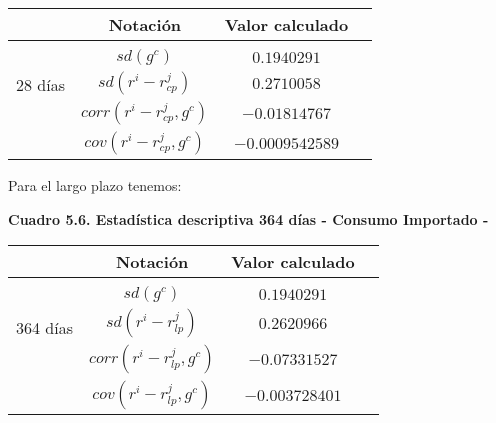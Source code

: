 \documentclass[
]{article}
\begin{document}
\begin{table}[h!]
                \begin{center} 
                    \begin{tabular}{|c|c|c|c|} 
                        \hline 
                        \mbox{}\;\;\;\;\;\mbox{}& \; Notación\;  & \; Valor calculado\; \\ 
                        \hline 
                        \multirow{4}{*}{\begin{sideways}28 días\end{sideways}}
                        &  &   \\
                        & $sd(g^c)$  & $0.1940291$  \\ 
                        &$sd(r^i-r_{cp}^j)$ & $0.2710058$ \\ 
                        &$corr(r^i-r_{cp}^j, g^c)$ & $-0.01814767$ \\ 
                        &$cov(r^i-r_{cp}^j, g^c)$  & $-0.0009542589$ \\                         
                        \hline \hline
                        \hline
                    \end{tabular}
                \end{center}
\end{table}

Para el largo plazo tenemos:

\begin{center}
\textbf{Cuadro 5.6. Estadística descriptiva 364 días - Consumo Importado -}
\end{center}

\begin{table}[h!]
                \begin{center} 
                    \begin{tabular}{|c|c|c|c|} 
                        \hline 
                        \mbox{}\;\;\;\;\;\mbox{}& \; Notación\;  & \; Valor calculado\; \\ 
                        \hline 
                        \multirow{4}{*}{\begin{sideways}364 días\end{sideways}}
                        &  &   \\
                        & $sd(g^c)$  & $0.1940291$  \\ 
                        &$sd(r^i-r_{lp}^j)$ & $0.2620966$ \\ 
                        &$corr(r^i-r_{lp}^j, g^c)$ & $-0.07331527$ \\ 
                        &$cov(r^i-r_{lp}^j, g^c)$  & $-0.003728401$ \\                      
                        \hline \hline
                        \hline
                    \end{tabular}
                \end{center}
\end{table}
\end{document}

